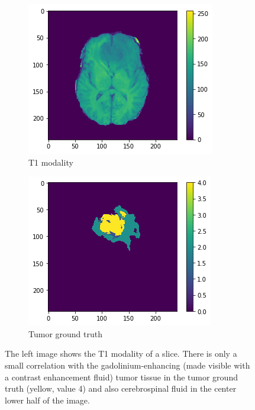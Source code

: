 \begin{figure}[H]
    \centering
    \begin{subfigure}{.5\textwidth}
        \centering
        \includegraphics[width=\linewidth]{chapters/04_segmentation/images/medical_background/t1.png}
        \caption{T1 modality}
    \end{subfigure}%
    \begin{subfigure}{.5\textwidth}
        \centering
        \includegraphics[width=\linewidth]{chapters/04_segmentation/images/medical_background/tumor.png}
        \caption{Tumor ground truth}
    \end{subfigure}
    \caption{The left image shows the T1 modality of a slice. There is only a small correlation with the gadolinium-enhancing (made visible with a contrast enhancement fluid) tumor tissue in the tumor ground truth (yellow, value 4) and also cerebrospinal fluid in the center lower half of the image.}
    \label{medical_background_t1}
\end{figure}



